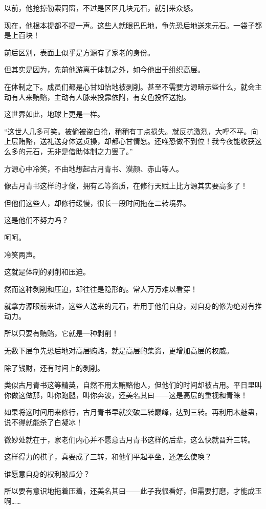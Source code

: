 \begin{this_body}
以前，他抢掠勒索同窗，不过是区区几块元石，就引来众怒。

现在，他根本提都不提一声。这些人就眼巴巴地，争先恐后地送来元石。一袋子都是上百块！

前后区别，表面上似乎是方源有了家老的身份。

但其实是因为，先前他游离于体制之外，如今他出于组织高层。

在体制之下。成员们都是心甘如怡地被剥削。甚至不需要方源暗示些什么，就会主动有人来贿赂，主动有人脉来投靠依附，有女色投怀送抱。

这世界如此，地球上更是一样。

“这世人几多可笑。被偷被盗白抢，稍稍有丁点损失。就反抗激烈，大呼不平。向上层贿赂，送礼送身体送贞操，却都心甘情愿。还唯恐做不到位！我今夜能收获这么多的元石，无非是借助体制之力罢了。”

方源心中冷笑，不由地想起古月青书、漠颜、赤山等人。

像古月青书这样的才俊，拥有乙等资质，在修行天赋上比方源其实要高多了！

但他们这些人，却修行缓慢，很长一段时间拖在二转境界。

这是他们不努力吗？

呵呵。

冷笑两声。

这就是体制的剥削和压迫。

然而这种剥削和压迫，却往往是隐形的。常人万万难以看穿！

就拿方源眼前来讲，这些人送来的元石，若用于他们自身，对自身的修为绝对有推动力。

所以只要有贿赂，它就是一种剥削！

无数下层争先恐后地对高层贿赂，就是高层的集资，更增加高层的权威。

除了钱财，还有时间上的剥削。

类似古月青书这等精英，自然不用太贿赂他人，但他们的时间却被占用。平日里叫你做这做那，叫你跑腿，叫你奔波，还美名其曰——这是高层的重视和青睐！

如果将这时间用来修行，古月青书早就突破二转巅峰，达到三转。再利用木魅蛊，说不得就能杀了白凝冰！

微妙处就在于，家老们内心并不愿意古月青书这样的后辈，这么快就晋升三转。

这样得力的棋子，真要成了三转，和他们平起平坐，还怎么使唤？

谁愿意自身的权利被瓜分？

所以要有意识地拖着压着，还美名其曰——此子我很看好，但需要打磨，才能成玉啊……


\end{this_body}
